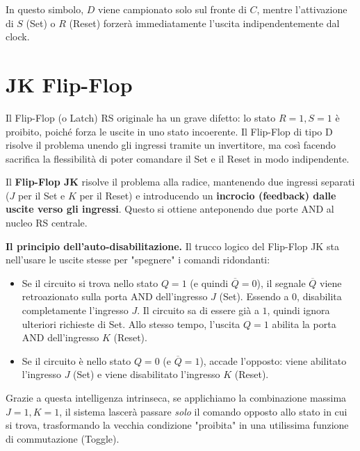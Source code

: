 \documentclass[11pt,a4paper]{report}
\begin{document}
In questo simbolo, $D$ viene campionato solo sul fronte di $C$, mentre l'attivazione di $S$ (Set) o $R$ (Reset) forzerà immediatamente l'uscita indipendentemente dal clock.

\section{JK Flip-Flop}
\label{sec:jk_ff}

Il Flip-Flop (o Latch) RS originale ha un grave difetto: lo stato $R=1, S=1$ è proibito, poiché forza le uscite in uno stato incoerente. Il Flip-Flop di tipo D risolve il problema unendo gli ingressi tramite un invertitore, ma così facendo sacrifica la flessibilità di poter comandare il Set e il Reset in modo indipendente.

Il \textbf{Flip-Flop JK} risolve il problema alla radice, mantenendo due ingressi separati ($J$ per il Set e $K$ per il Reset) e introducendo un \textbf{incrocio (feedback) dalle uscite verso gli ingressi}. Questo si ottiene anteponendo due porte AND al nucleo RS centrale.

\medskip
\noindent\textbf{Il principio dell'auto-disabilitazione.}
Il trucco logico del Flip-Flop JK sta nell'usare le uscite stesse per "spegnere" i comandi ridondanti:
\begin{itemize}[leftmargin=1.5em]
    \item Se il circuito si trova nello stato $Q=1$ (e quindi $\overline{Q}=0$), il segnale $\overline{Q}$ viene retroazionato sulla porta AND dell'ingresso $J$ (Set). Essendo a $0$, disabilita completamente l'ingresso $J$. Il circuito sa di essere già a $1$, quindi ignora ulteriori richieste di Set. Allo stesso tempo, l'uscita $Q=1$ abilita la porta AND dell'ingresso $K$ (Reset).
    \item Se il circuito è nello stato $Q=0$ (e $\overline{Q}=1$), accade l'opposto: viene abilitato l'ingresso $J$ (Set) e viene disabilitato l'ingresso $K$ (Reset).
\end{itemize}
Grazie a questa intelligenza intrinseca, se applichiamo la combinazione massima $J=1, K=1$, il sistema lascerà passare \emph{solo} il comando opposto allo stato in cui si trova, trasformando la vecchia condizione "proibita" in una utilissima funzione di commutazione (Toggle).
\end{document}
